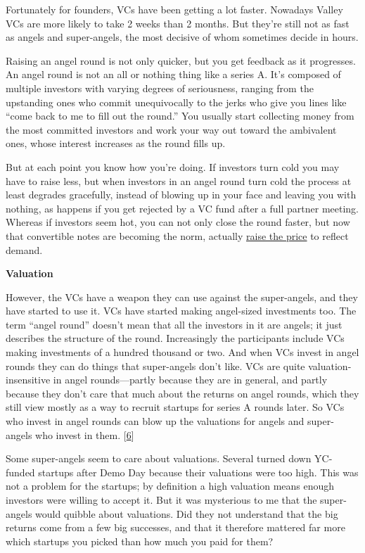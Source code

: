 Fortunately for founders, VCs have been getting a lot faster. Nowadays
Valley VCs are more likely to take 2 weeks than 2 months. But they're
still not as fast as angels and super-angels, the most decisive of whom
sometimes decide in hours.

Raising an angel round is not only quicker, but you get feedback as it
progresses. An angel round is not an all or nothing thing like a series
A. It's composed of multiple investors with varying degrees of
seriousness, ranging from the upstanding ones who commit unequivocally
to the jerks who give you lines like ``come back to me to fill out the
round.'' You usually start collecting money from the most committed
investors and work your way out toward the ambivalent ones, whose
interest increases as the round fills up.

But at each point you know how you're doing. If investors turn cold you
may have to raise less, but when investors in an angel round turn cold
the process at least degrades gracefully, instead of blowing up in your
face and leaving you with nothing, as happens if you get rejected by a
VC fund after a full partner meeting. Whereas if investors seem hot, you
can not only close the round faster, but now that convertible notes are
becoming the norm, actually \href{hiresfund.html}{raise the price} to
reflect demand.

\textbf{Valuation}

However, the VCs have a weapon they can use against the super-angels,
and they have started to use it. VCs have started making angel-sized
investments too. The term ``angel round'' doesn't mean that all the
investors in it are angels; it just describes the structure of the
round. Increasingly the participants include VCs making investments of a
hundred thousand or two. And when VCs invest in angel rounds they can do
things that super-angels don't like. VCs are quite valuation-insensitive
in angel rounds---partly because they are in general, and partly because
they don't care that much about the returns on angel rounds, which they
still view mostly as a way to recruit startups for series A rounds
later. So VCs who invest in angel rounds can blow up the valuations for
angels and super-angels who invest in them. {[}\hyperref[f6n]{6}{]}

Some super-angels seem to care about valuations. Several turned down
YC-funded startups after Demo Day because their valuations were too
high. This was not a problem for the startups; by definition a high
valuation means enough investors were willing to accept it. But it was
mysterious to me that the super-angels would quibble about valuations.
Did they not understand that the big returns come from a few big
successes, and that it therefore mattered far more which startups you
picked than how much you paid for them?

